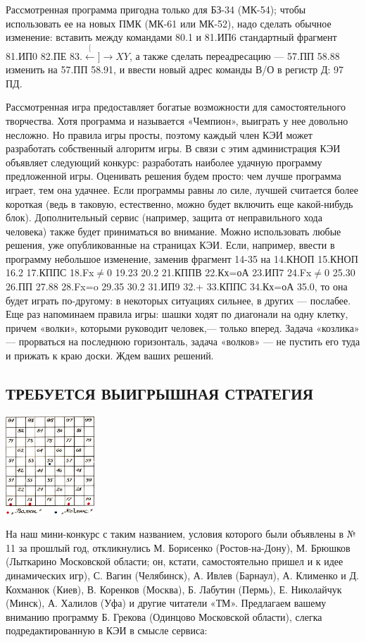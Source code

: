 \documentclass[11pt,a4paper,oneside]{article}
\def\XY{$\stackrel[\leftarrow]{\rightarrow}{XY}$}
\begin{document}
Рассмотренная программа пригодна только для БЗ-34 (МК-54); чтобы использовать ее на новых ПМК (МК-61 или МК-52), надо сделать обычное изменение: вставить между командами 80.1 и 81.ИП6 стандартный фрагмент 81.ИП0 82.ПЕ 83.\XY, а также сделать переадресацию — 57.ПП 58.88 изменить на 57.ПП 58.91, и ввести новый адрес команды В/О в регистр Д: 97 ПД.

Рассмотренная игра предоставляет богатые возможности для самостоятельного творчества. Хотя программа и называется «Чемпион», выиграть у нее довольно несложно. Но правила игры просты, поэтому каждый член КЭИ может разработать собственный алгоритм игры. В связи с этим администрация КЭИ объявляет следующий конкурс: разработать наиболее удачную программу предложенной игры. Оценивать решения будем просто: чем лучше программа играет, тем она удачнее. Если программы равны ло силе, лучшей считается более короткая (ведь в таковую, естественно, можно будет включить еще какой-нибудь блок). Дополнительный сервис (например, защита от неправильного хода человека) также будет приниматься во внимание. Можно использовать любые решения, уже опубликованные на страницах КЭИ. Если, например, ввести в программу небольшое изменение, заменив фрагмент 14-35 на 14.КНОП 15.КНОП 16.2 17.КППС 18.Fx$\neq$0 19.23 20.2 21.КППВ 22.Кх=оА 23.ИП7 24.Fx$\neq$0 25.30 26.ПП 27.88 28.Fx=o 29.35 30.2 31.ИП9 32.+ 33.КППС 34.Кх=оА 35.0, то она будет играть по-другому: в некоторых ситуациях сильнее, в других — послабее. Еще раз напоминаем правила игры: шашки ходят по диагонали на одну клетку, причем «волки», которыми руководит человек,— только вперед. Задача «козлика» — прорваться на последнюю горизонталь, задача «волков» — не пустить его туда и прижать к краю доски. Ждем ваших решений.

\subsection{ТРЕБУЕТСЯ ВЫИГРЫШНАЯ СТРАТЕГИЯ}

\includegraphics[width=0.25\textwidth]{win_strategy2}

На наш мини-конкурс с таким названием, условия которого были объявлены в № 11 за прошлый год, откликнулись М. Борисенко (Ростов-на-Дону), М. Брюшков (Лыткарино Московской области; он, кстати, самостоятельно пришел и к идее динамических игр), С. Вагин (Челябинск), А. Ивлев (Барнаул), А. Клименко и Д. Кохманюк (Киев), В. Коренков (Москва), Б. Лабутин (Пермь), Е. Николайчук (Минск), А. Халилов (Уфа) и другие читатели «ТМ». Предлагаем вашему вниманию программу Б. Грекова (Одинцово Московской области), слегка подредактированную в КЭИ в смысле сервиса:
\end{document}
